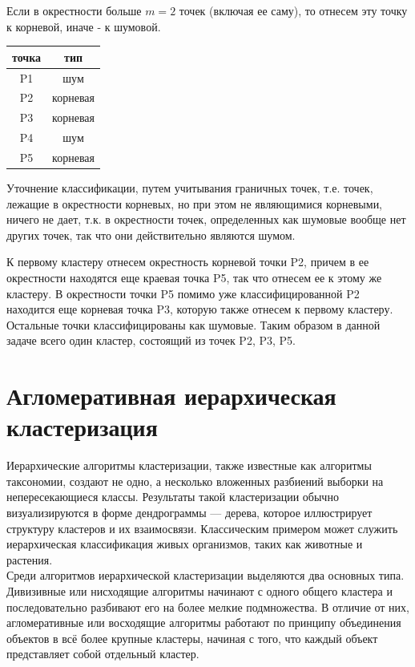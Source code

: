 Если в окрестности больше $m=2$ точек (включая ее саму), то отнесем эту точку к корневой, иначе - к шумовой.

\begin{center}
\begin{tabular}{ |c|c| } 
 \hline
 точка & тип \\\hline
 P1 & шум\\ 
 P2 & корневая\\ 
 P3 & корневая\\ 
 P4 & шум\\
 P5 & корневая\\
 \hline
\end{tabular}
\end{center}

Уточнение классификации, путем учитывания граничных точек, т.е. точек, лежащие в окрестности корневых, но при этом не являющимися корневыми, ничего не дает, т.к. в окрестности точек, определенных как шумовые вообще нет других точек, так что они действительно являются шумом.

К первому кластеру отнесем окрестность корневой точки P2, причем в ее окрестности находятся еще краевая точка P5, так что отнесем ее к этому же кластеру. В окрестности точки P5 помимо уже классифицированной P2 находится еще корневая точка P3, которую также отнесем к первому кластеру. Остальные точки классифицированы как шумовые. Таким образом в данной задаче всего один кластер, состоящий из точек P2, P3, P5.

\section{Агломеративная иерархическая кластеризация}
Иерархические алгоритмы кластеризации, также известные как алгоритмы таксономии, создают не одно, а несколько вложенных разбиений выборки на непересекающиеся классы. Результаты такой кластеризации обычно визуализируются в форме дендрограммы — дерева, которое иллюстрирует структуру кластеров и их взаимосвязи. Классическим примером может служить иерархическая классификация живых организмов, таких как животные и растения. \\
Среди алгоритмов иерархической кластеризации выделяются два основных типа. Дивизивные или нисходящие алгоритмы начинают с одного общего кластера и последовательно разбивают его на более мелкие подмножества. В отличие от них, агломеративные или восходящие алгоритмы работают по принципу объединения объектов в всё более крупные кластеры, начиная с того, что каждый объект представляет собой отдельный кластер.


